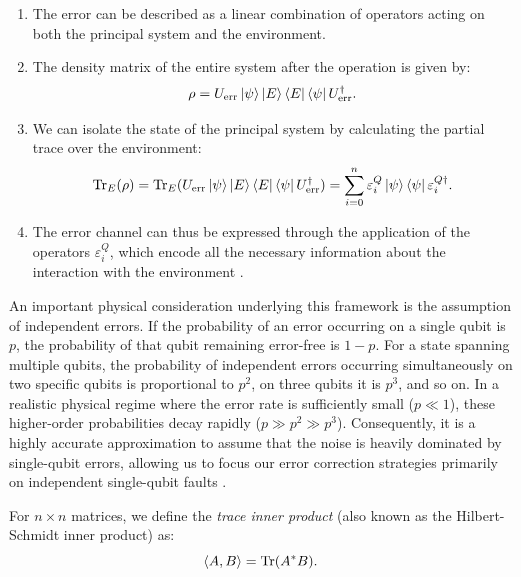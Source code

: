 \begin{enumerate}
\item The error can be described as a linear combination of operators acting on both the principal system and the environment.
\item The density matrix of the entire system after the operation is given by:
\begin{equation}
\rho = U_{\text{err}}\ket{\psi}\ket{E}\bra{E}\bra{\psi}U_{\text{err}}^\dagger
.\end{equation}
\item We can isolate the state of the principal system by calculating the partial trace over the environment:
\begin{equation}
  \operatorname{Tr}_E(\rho) = \operatorname{Tr}_E(U_{\text{err}}\ket{\psi}\ket{E}\bra{E}\bra{\psi}U_{\text{err}}^\dagger) = \sum_{i = 0}^n \varepsilon_i^Q \ket{\psi} \bra{\psi} \varepsilon_i^{Q\dagger}
.\end{equation}
\item The error channel can thus be expressed through the application of the operators $\varepsilon_i^Q$, which encode all the necessary information about the interaction with the environment \citep{Mosca2007}.
\end{enumerate}

An important physical consideration underlying this framework is the assumption of independent errors. If the probability of an error occurring on a single qubit is $p$, the probability of that qubit remaining error-free is $1 - p$. For a state spanning multiple qubits, the probability of independent errors occurring simultaneously on two specific qubits is proportional to $p^2$, on three qubits it is $p^3$, and so on. In a realistic physical regime where the error rate is sufficiently small ($p \ll 1$), these higher-order probabilities decay rapidly ($p \gg p^2 \gg p^3$). Consequently, it is a highly accurate approximation to assume that the noise is heavily dominated by single-qubit errors, allowing us to focus our error correction strategies primarily on independent single-qubit faults \citep{Nielsen2010}.


\begin{definition}
\label{def:trace_class_norm}
For $n\times n$ matrices, we define the \textit{trace inner product} (also known as the Hilbert-Schmidt inner product) as:
\begin{equation}
\langle A, B \rangle = \operatorname{Tr}(A^*B)
.\end{equation}
\end{definition}

